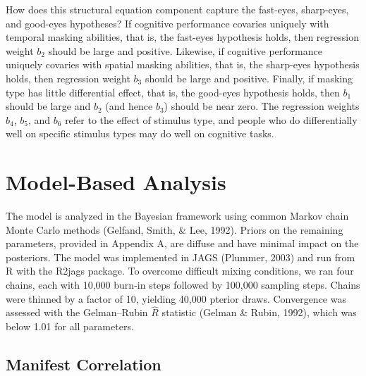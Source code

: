 \documentclass[
  ,man]{apa6}
\begin{document}
How does this structural equation component capture the fast-eyes, sharp-eyes, and good-eyes hypotheses? If cognitive performance covaries uniquely with temporal masking abilities, that is, the fast-eyes hypothesis holds, then regression weight \(b_2\) should be large and positive. Likewise, if cognitive performance uniquely covaries with spatial masking abilities, that is, the sharp-eyes hypothesis holds, then regression weight \(b_3\) should be large and positive. Finally, if masking type has little differential effect, that is, the good-eyes hypothesis holds, then \(b_1\) should be large and \(b_2\) (and hence \(b_3\)) should be near zero. The regression weights \(b_4\), \(b_5\), and \(b_6\) refer to the effect of stimulus type, and people who do differentially well on specific stimulus types may do well on cognitive tasks.

\section{Model-Based Analysis}\label{model-based-analysis}

The model is analyzed in the Bayesian framework using common Markov chain Monte Carlo methods (Gelfand, Smith, \& Lee, 1992). Priors on the remaining parameters, provided in Appendix A, are diffuse and have minimal impact on the posteriors. The model was implemented in JAGS (Plummer, 2003) and run from R with the R2jags package. To overcome difficult mixing conditions, we ran four chains, each with 10,000 burn-in steps followed by 100,000 sampling steps. Chains were thinned by a factor of 10, yielding 40,000 pterior draws. Convergence was assessed with the Gelman--Rubin \(\hat{R}\) statistic (Gelman \& Rubin, 1992), which was below 1.01 for all parameters.

\subsection{Manifest Correlation}\label{manifest-correlation}
\end{document}

